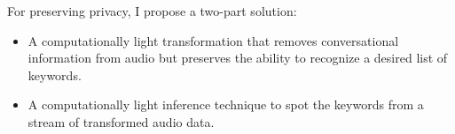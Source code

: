 For preserving privacy, I propose a two-part solution:
\begin{itemize}
\item A computationally light transformation that removes conversational information from audio but preserves the ability to recognize a desired list of keywords.
\item A computationally light inference technique to spot the keywords from a stream of transformed audio data.
\end{itemize}


